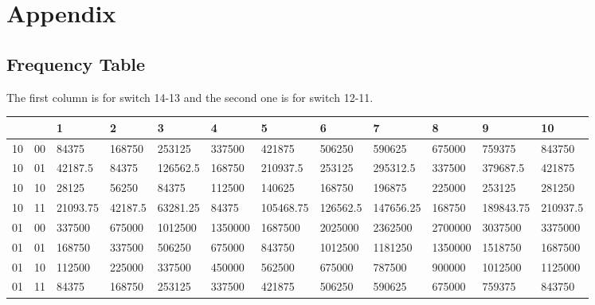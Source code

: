 \documentclass[11pt]{scrartcl}
\begin{document}
 
\section{Appendix}

\subsection{Frequency Table}
\label{sec:fre}
The first column is for switch 14-13 and the second one is for switch 12-11.\\

\begin{minipage}{.5\linewidth}
\begin{tabular}{p{0.3cm}|p{0.3cm}| p{1.2cm}|p{1.2cm}|p{1.2cm}|p{1.2cm}|p{1.2cm}|p{1.2cm}|p{1.2cm}|p{1.2cm}|p{1.2cm}|p{1.2cm}}

&& 1 & 2 & 3 & 4 & 5 & 6 & 7 & 8 & 9 &10 \\ \hline


10&00&84375&168750&253125&337500&421875&506250&590625&675000&759375&843750\\ \hline




10&01&42187.5&84375&126562.5&168750&210937.5&253125&295312.5&337500&379687.5&421875\\ \hline




10&10&28125&56250&84375&112500&140625&168750&196875&225000&253125&281250\\ \hline




10&11&21093.75&42187.5&63281.25&84375&105468.75&126562.5&147656.25&168750&189843.75&210937.5\\ \hline




01&00&337500&675000&1012500&1350000&1687500&2025000&2362500&2700000&3037500&3375000\\ \hline




01&01&168750&337500&506250&675000&843750&1012500&1181250&1350000&1518750&1687500\\ \hline




01&10&112500&225000&337500&450000&562500&675000&787500&900000&1012500&1125000\\ \hline




01&11&84375&168750&253125&337500&421875&506250&590625&675000&759375&843750\\ \hline





\end{tabular}
\end{minipage}
\end{document}

